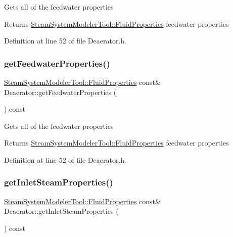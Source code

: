 Gets all of the feedwater properties \begin{DoxyReturn}{Returns}
\hyperlink{struct_steam_system_modeler_tool_1_1_fluid_properties}{Steam\+System\+Modeler\+Tool\+::\+Fluid\+Properties} feedwater properties 
\end{DoxyReturn}


Definition at line 52 of file Deaerator.\+h.

\mbox{\label{class_deaerator_ab2ab900e36c86e48ad92c4013c471d6b}} 
\subsubsection{\texorpdfstring{get\+Feedwater\+Properties()}{getFeedwaterProperties()}\hspace{0.1cm}{\footnotesize\ttfamily [3/3]}}
{\footnotesize\ttfamily \hyperlink{struct_steam_system_modeler_tool_1_1_fluid_properties}{Steam\+System\+Modeler\+Tool\+::\+Fluid\+Properties} const\& Deaerator\+::get\+Feedwater\+Properties (\begin{DoxyParamCaption}{ }\end{DoxyParamCaption}) const\hspace{0.3cm}{\ttfamily [inline]}}

Gets all of the feedwater properties \begin{DoxyReturn}{Returns}
\hyperlink{struct_steam_system_modeler_tool_1_1_fluid_properties}{Steam\+System\+Modeler\+Tool\+::\+Fluid\+Properties} feedwater properties 
\end{DoxyReturn}


Definition at line 52 of file Deaerator.\+h.

\mbox{\label{class_deaerator_a7298fa1e4930e73dd5340411e8ccff33}} 
\subsubsection{\texorpdfstring{get\+Inlet\+Steam\+Properties()}{getInletSteamProperties()}\hspace{0.1cm}{\footnotesize\ttfamily [1/3]}}
{\footnotesize\ttfamily \hyperlink{struct_steam_system_modeler_tool_1_1_fluid_properties}{Steam\+System\+Modeler\+Tool\+::\+Fluid\+Properties} const\& Deaerator\+::get\+Inlet\+Steam\+Properties (\begin{DoxyParamCaption}{ }\end{DoxyParamCaption}) const\hspace{0.3cm}{\ttfamily [inline]}}

